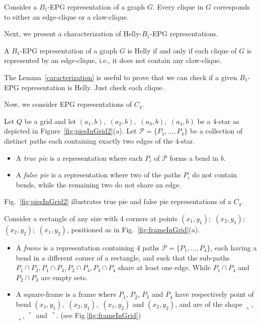 \begin{lemma}\label{edge-claw-clique} 
Consider a $B_1$-EPG representation of a graph $G$. Every clique in $G$ corresponds to either an edge-clique or a claw-clique.
\end{lemma}

Next, we present a characterization of Helly-$B_1$-EPG representations.

\begin{lemma}\label{caracterization}
A $B_1$-EPG representation of a graph $G$ is Helly if and only if each clique of $G$ is represented by an edge-clique, i.e., it does not contain any claw-clique.
\end{lemma}

The Lemma~\ref{caracterization} is useful to prove that we can check if a given $B_1$-EPG representation is Helly. Just check each clique. 

Now, we consider EPG representations of $C_4$.

\begin{definition} \label{defi:tortasFrame}
Let $ Q $ be a grid and let $ (a_1, b),$ $(a_2, b),$ $(a_3, b),$ $(a_4, b)$ be a 4-star as depicted in Figure~\ref{fig:piesInGrid2}(a). Let $ \mathcal{P} = \{P_1, \dots , P_4\}$ be a collection of distinct paths each containing exactly two edges of the $4$-star.
\begin{itemize}
\item A \emph{true pie} is a representation where each $P_i$ of $ \mathcal{P} $ forms a bend in $b$.

\item A \emph {false pie} is a representation where two of the paths $P_i$ do not contain bends, while the remaining two do not share an edge. 
\end{itemize}
\end{definition}

Fig.~\ref{fig:piesInGrid2} illustrates true pie and false pie representations of a $C_4$.



\begin{definition} \label{defi:tortasFrame2}
 Consider a rectangle of any size with 4 corners at points $ (x_1, y_1);$ $(x_2, y_1);$ $(x_2, y_2);$ $(x_1, y_2) $, positioned as in  Fig.~\ref{fig:frameInGrid}(a). 
 \begin{itemize}
 \item A \emph{frame} is a representation containing 4 paths $\mathcal{P} =  \{ P_1, \dots, P_4\} $, each having a bend in a different corner of a rectangle, and such that the  sub-paths $ P_1 \cap P_2, P_1 \cap P_3, P_2 \cap P_4, P_3 \cap P_4 $ share at least one edge. While $P_1 \cap P_4 $ and $ P_2 \cap P_3$ are empty sets.
 
 \item A square-frame is a frame where $P_1$, $P_2$, $P_3$ and $P_4$ have respectively point of bend $ (x_1, y_1),$ $(x_2, y_1),$ $(x_1, y_2)$ and $(x_2, y_2)$, and are of the shape $\llcorner$, $\lrcorner$, $\ulcorner$ and $\urcorner$.  (see Fig.\ref{fig:frameInGrid})
 \end{itemize}
\end{definition}

